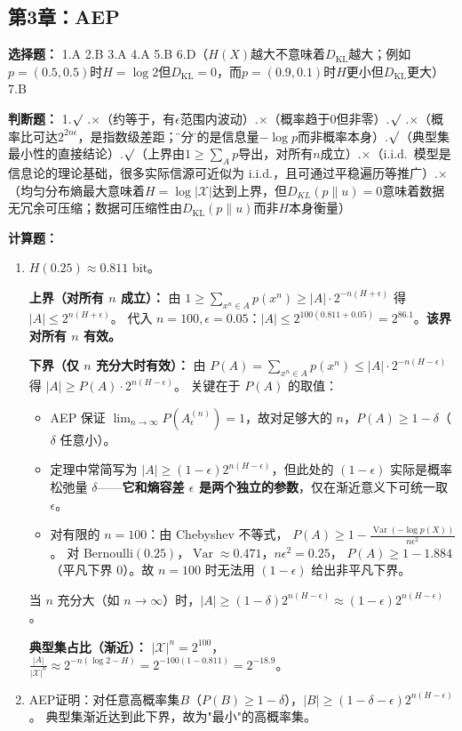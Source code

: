 \documentclass[12pt,a4paper]{ctexart}
\newcommand{\XX}{\mathcal{X}}
\newcommand{\DKL}{D_{\mathrm{KL}}}
\begin{document}
\subsection*{第3章：AEP}

\textbf{选择题：} 1.A \quad 2.B \quad 3.A \quad 4.A \quad 5.B \quad 6.D（$H(X)$越大不意味着$\DKL$越大；例如$p=(0.5,0.5)$时$H=\log 2$但$\DKL=0$，而$p=(0.9,0.1)$时$H$更小但$\DKL$更大）\quad 7.B

\textbf{判断题：} 1.$\surd$ .$\times$（约等于，有$\epsilon$范围内波动）.$\times$（概率趋于0但非零）.$\surd$ .$\times$（概率比可达$2^{2n\epsilon}$，是指数级差距；\"等分\"指的是信息量$-\log p$而非概率本身）.$\surd$（典型集最小性的直接结论）.$\surd$（上界由$1\geq\sum_A p$导出，对所有$n$成立）.$\times$（i.i.d.\ 模型是信息论的理论基础，很多实际信源可近似为 i.i.d.，且可通过平稳遍历等推广）.$\times$（均匀分布熵最大意味着$H=\log|\XX|$达到上界，但$D_{KL}(p\|u)=0$意味着数据无冗余可压缩；数据可压缩性由$\DKL(p\|u)$而非$H$本身衡量）

\textbf{计算题：}
\begin{enumerate}[leftmargin=*]
\item[(1)] $H(0.25)\approx0.811$ bit。

\textbf{上界（对所有 $n$ 成立）：}
由 $1 \geq \sum_{x^n\in A} p(x^n) \geq |A| \cdot 2^{-n(H+\epsilon)}$ 得 $|A| \leq 2^{n(H+\epsilon)}$。
代入 $n=100,\epsilon=0.05$：$|A| \leq 2^{100(0.811+0.05)} = 2^{86.1}$。\textbf{该界对所有 $n$ 有效。}

\textbf{下界（仅 $n$ 充分大时有效）：}
由 $P(A) = \sum_{x^n\in A} p(x^n) \leq |A| \cdot 2^{-n(H-\epsilon)}$ 得 $|A| \geq P(A) \cdot 2^{n(H-\epsilon)}$。
关键在于 $P(A)$ 的取值：
\begin{itemize}
  \item AEP 保证 $\lim_{n\to\infty} P(A_\epsilon^{(n)}) = 1$，故对足够大的 $n$，$P(A) \geq 1-\delta$（$\delta$ 任意小）。
  \item 定理中常简写为 $|A| \geq (1-\epsilon)2^{n(H-\epsilon)}$，但此处的 $(1-\epsilon)$ 实际是概率松弛量 $\delta$——\textbf{它和熵容差 $\epsilon$ 是两个独立的参数}，仅在渐近意义下可统一取 $\epsilon$。
  \item 对有限的 $n=100$：由 Chebyshev 不等式，
  $P(A) \geq 1 - \frac{\operatorname{Var}(-\log p(X))}{n\epsilon^2}$。
  对 Bernoulli$(0.25)$，$\operatorname{Var}\approx 0.471$，$n\epsilon^2=0.25$，
  $P(A) \geq 1-1.884$（平凡下界 $0$）。故 $n=100$ 时无法用 $(1-\epsilon)$ 给出非平凡下界。
\end{itemize}
当 $n$ 充分大（如 $n\to\infty$）时，$|A| \geq (1-\delta)2^{n(H-\epsilon)} \approx (1-\epsilon)2^{n(H-\epsilon)}$。

\textbf{典型集占比（渐近）：}
$|\XX|^n=2^{100}$，$\frac{|A|}{|\XX|^n} \approx 2^{-n(\log 2 - H)} = 2^{-100(1-0.811)} = 2^{-18.9}$。
\item[(2)] AEP证明：对任意高概率集$B$（$P(B)\geq1-\delta$），$|B|\geq(1-\delta-\epsilon)2^{n(H-\epsilon)}$。
典型集渐近达到此下界，故为"最小"的高概率集。
\end{enumerate}
\end{document}
